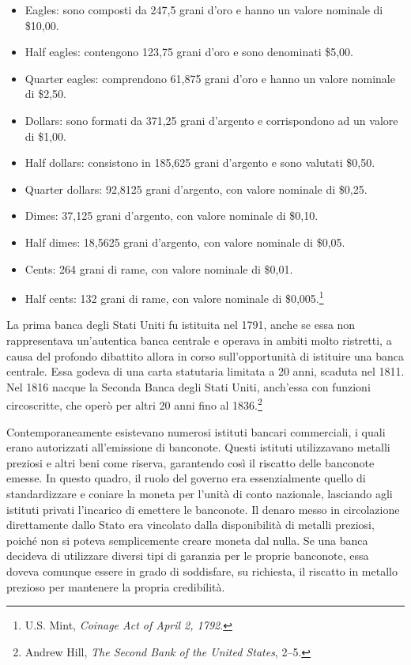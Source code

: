 \documentclass[
  a5paper,
  smalldemyvopaper,10pt,twoside,onecolumn,openright,extrafontsizes,hidelinks]{memoir}
\begin{document}
\begin{itemize}
\item
  Eagles: sono composti da 247,5 grani d'oro e hanno un valore nominale
  di \$10,00.
\item
  Half eagles: contengono 123,75 grani d'oro e sono denominati \$5,00.
\item
  Quarter eagles: comprendono 61,875 grani d'oro e hanno un valore
  nominale di \$2,50.
\item
  Dollars: sono formati da 371,25 grani d'argento e corrispondono ad un
  valore di \$1,00.
\item
  Half dollars: consistono in 185,625 grani d'argento e sono valutati
  \$0,50.
\item
  Quarter dollars: 92,8125 grani d'argento, con valore nominale di
  \$0,25.
\item
  Dimes: 37,125 grani d'argento, con valore nominale di \$0,10.
\item
  Half dimes: 18,5625 grani d'argento, con valore nominale di \$0,05.
\item
  Cents: 264 grani di rame, con valore nominale di \$0,01.
\item
  Half cents: 132 grani di rame, con valore nominale di
  \$0,005.\footnote{U.S. Mint, \emph{Coinage Act of April 2, 1792}.}
\end{itemize}

La prima banca degli Stati Uniti fu istituita nel 1791, anche se essa
non rappresentava un'autentica banca centrale e operava in ambiti molto
ristretti, a causa del profondo dibattito allora in corso
sull'opportunità di istituire una banca centrale. Essa godeva di una
carta statutaria limitata a 20 anni, scaduta nel 1811. Nel 1816 nacque
la Seconda Banca degli Stati Uniti, anch'essa con funzioni circoscritte,
che operò per altri 20 anni fino al 1836.\footnote{Andrew Hill,
  \emph{The Second Bank of the United States}, 2--5.}

Contemporaneamente esistevano numerosi istituti bancari commerciali, i
quali erano autorizzati all'emissione di banconote. Questi istituti
utilizzavano metalli preziosi e altri beni come riserva, garantendo così
il riscatto delle banconote emesse. In questo quadro, il ruolo del
governo era essenzialmente quello di standardizzare e coniare la moneta
per l'unità di conto nazionale, lasciando agli istituti privati
l'incarico di emettere le banconote. Il denaro messo in circolazione
direttamente dallo Stato era vincolato dalla disponibilità di metalli
preziosi, poiché non si poteva semplicemente creare moneta dal nulla. Se
una banca decideva di utilizzare diversi tipi di garanzia per le proprie
banconote, essa doveva comunque essere in grado di soddisfare, su
richiesta, il riscatto in metallo prezioso per mantenere la propria
credibilità.
\end{document}
